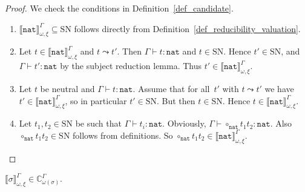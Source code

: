 \documentclass[runningheads,a4paper]{llncs}
\newcommand{\nat}{\mathtt{nat}}
\newcommand{\SN}{\mathrm{SN}}
\newcommand{\Cb}{\mathbb{C}}
\newcommand{\val}[3]{\ensuremath{\llbracket#1\rrbracket_{#2}^{#3}}}
\newcommand{\proves}{\vdash}
\begin{document}
\begin{proof}
  We check the conditions in Definition~\ref{def_candidate}.
  \begin{enumerate}
  \item $\val{\nat}{\omega,\xi}{\Gamma} \subseteq \SN$ follows
    directly from Definition~\ref{def_reducibility_valuation}.
  \item Let $t \in \val{\nat}{\omega,\xi}{\Gamma}$ and
    $t \leadsto t'$. Then $\Gamma \proves t : \nat$ and $t \in
    \SN$. Hence $t' \in \SN$, and $\Gamma \proves t' : \nat$ by the
    subject reduction lemma. Thus
    $t' \in \val{\nat}{\omega,\xi}{\Gamma}$.
  \item Let $t$ be neutral and $\Gamma \proves t : \nat$. Assume that
    for all~$t'$ with $t \leadsto t'$ we have
    $t' \in \val{\nat}{\omega,\xi}{\Gamma}$, so in particular
    $t' \in \SN$. But then $t \in \SN$. Hence
    $t \in \val{\nat}{\omega,\xi}{\Gamma}$.
  \item Let $t_1,t_2 \in \SN$ be such that
    $\Gamma \proves t_i : \nat$. Obviously,
    $\Gamma \proves \circ_\nat t_1 t_2 : \nat$. Also
    $\circ_\nat t_1 t_2 \in \SN$ follows from definitions. So
    $\circ_\nat t_1 t_2 \in \val{\nat}{\omega,\xi}{\Gamma}$.
  \end{enumerate}
\end{proof}

\begin{lemma}\label{lem_val_computable}
  $\val{\sigma}{\omega,\xi}{\Gamma} \in \Cb_{\omega(\sigma)}^\Gamma$.
\end{lemma}
\end{document}
